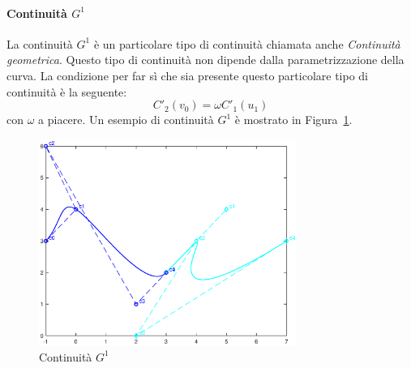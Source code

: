 \documentclass[a4paper, 12pt]{article}
\begin{document}
\paragraph{Continuità $G^1$}
La continuità $G^1$ è un particolare tipo di continuità chiamata anche \textit{Continuità geometrica}. Questo tipo 
di continuità non dipende dalla parametrizzazione della curva. La condizione per far sì che sia presente questo 
particolare tipo di continuità è la seguente:
$$C'_2(v_0) = \omega C'_1(u_1)$$ con $\omega$ a piacere.
Un esempio di continuità $G^1$ è mostrato in Figura~\ref{fig:continuityg1}.
\begin{figure}[]
  \centering
  \includegraphics[width=0.75\textwidth]{figure/continuity_g1.eps}
  \caption{Continuità $G^1$}
  \label{fig:continuityg1}
\end{figure} 
\end{document}
